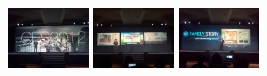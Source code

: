 \documentclass{acm_proc_article-sp}
\newcommand{\thumbheight}{16mm}
\newenvironment{thumbsequence}{}{\makebox[4mm]{}}
\begin{document}
\begin{figure}
\begin{centering}
	\begin{thumbsequence}
		\includegraphics[height=\thumbheight]{resources/ces/looseduplicate1.jpg}
		\includegraphics[height=\thumbheight]{resources/ces/looseduplicate2.jpg}
		\includegraphics[height=\thumbheight]{resources/ces/looseduplicate3.jpg}

\end{thumbsequence}
\end{centering}
\end{figure}
\end{document}
